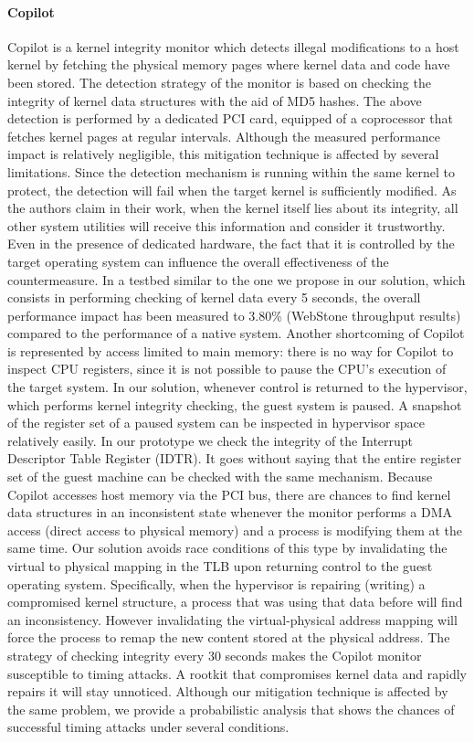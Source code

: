 \paragraph{Copilot}
Copilot \cite{copilot} is a kernel integrity monitor which detects illegal modifications to a host kernel by fetching the physical memory pages where kernel data and code have been stored. The detection strategy of the monitor is based on checking the integrity of kernel data structures with the aid of MD5 hashes. The above detection is performed by a dedicated PCI card, equipped of a coprocessor that fetches kernel pages at regular intervals. Although the measured performance impact is relatively negligible, this mitigation technique is affected by several limitations. Since the detection mechanism is running within the same kernel to protect, the detection will fail when the target kernel is sufficiently modified. As the authors claim in their work, when the kernel itself lies about its integrity, all other system utilities will receive this information and consider it trustworthy. Even in the presence of dedicated hardware, the fact that it is controlled by the target operating system can influence the overall effectiveness of the countermeasure. 
In a testbed similar to the one we propose in our solution, which consists in performing checking of kernel data  every 5 seconds, the overall performance impact has been measured to 3.80\% (WebStone throughput results) compared to the performance of a native system.   
Another shortcoming of Copilot is represented by access limited to main memory: there is no way for Copilot to inspect CPU registers, since it is not possible to pause the CPU's execution of the target system. In our solution, whenever control is returned to the hypervisor, which performs kernel integrity checking, the guest system is paused. A snapshot of the register set of a paused system can be inspected in hypervisor space relatively easily. In our prototype we check the integrity of the Interrupt Descriptor Table Register (IDTR). It goes without saying that the entire register set of the guest machine can be checked with the same mechanism. 
Because Copilot accesses host memory via the PCI bus, there are chances to find kernel data structures in an inconsistent state whenever the monitor performs a DMA access (direct access to physical memory) and a process is modifying them at the same time. Our solution avoids race conditions of this type by invalidating the virtual to physical mapping in the TLB upon returning control to the guest operating system. Specifically, when the hypervisor is repairing (writing) a compromised kernel structure, a process that was using that data before will find an inconsistency. However invalidating the virtual-physical address mapping will force the process to remap the new content stored at the physical address.
The strategy of checking integrity every 30 seconds makes the Copilot monitor susceptible to timing attacks. A rootkit that compromises kernel data and rapidly repairs it will stay unnoticed. Although our mitigation technique is affected by the same problem, we provide a probabilistic analysis that shows the chances of successful timing attacks under several conditions.


